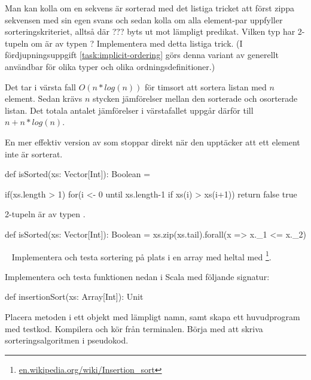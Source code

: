 \Subtask \label{subtask:isSorted-zip} Man kan kolla om en sekvens är sorterad med det listiga tricket att först zippa sekvensen med sin egen svans och sedan kolla om alla element-par uppfyller sorteringskriteriet, alltså  där ??? byts ut mot lämpligt predikat. Vilken typ har 2-tupeln  om  är av typen ? Implementera  med detta listiga trick. (I fördjupningsuppgift \ref{task:implicit-ordering} görs denna variant av  generellt användbar för olika typer och olika ordningsdefinitioner.)


\SOLUTION


\TaskSolved \what



\SubtaskSolved

Det tar i värsta fall $O(n*log(n))$ för timsort att sortera listan med $n$ element. Sedan krävs $n$ stycken jämförelser mellan den sorterade och osorterade listan. Det totala antalet jämförelser i värstafallet uppgår därför till $n + n*log(n)$.

\SubtaskSolved

En mer effektiv version av  som stoppar direkt när den upptäcker att ett element inte är sorterat.

\begin{Code}
def isSorted(xs: Vector[Int]): Boolean = {

  if(xs.length > 1){
    for(i <- 0 until xs.length-1 if xs(i) > xs(i+1)){
      return false
    }
  }
  true
}
\end{Code}

\SubtaskSolved

2-tupeln är av typen .

\begin{Code}
def isSorted(xs: Vector[Int]): Boolean =
  xs.zip(xs.tail).forall(x => x._1 <= x._2)
\end{Code}



\QUESTEND







\QUESTBEGIN

\Task  \what~ Implementera och testa sortering på plats i en array med heltal med \footnote{\href{https://en.wikipedia.org/wiki/Insertion_sort}{en.wikipedia.org/wiki/Insertion\_sort}}.

\Subtask Implementera och testa funktionen nedan i Scala med följande signatur:
\begin{Code}
  def insertionSort(xs: Array[Int]): Unit
\end{Code}
Placera metoden i ett objekt med lämpligt namn, samt skapa ett huvudprogram med testkod. Kompilera och kör från terminalen. Börja med att skriva sorteringsalgoritmen i pseudokod.

